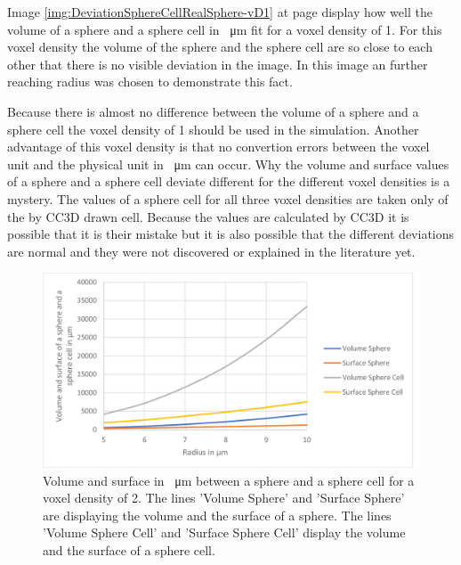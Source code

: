 Image \ref{img:DeviationSphereCellRealSphere-vD1} at page \pageref{img:DeviationSphereCellRealSphere-vD1} display how well the volume of a sphere and a sphere cell in \SI{}{\micro\metre} fit for a voxel density of 1. For this voxel density the volume of the sphere and the sphere cell are so close to each other that there is no visible deviation in the image. In this image an further reaching radius was chosen to demonstrate this fact.

Because there is almost no difference between the volume of a sphere and a sphere cell the voxel density of 1 should be used in the simulation. Another advantage of this voxel density is that no convertion errors between the voxel unit and the physical unit in \SI{}{\micro\metre} can occur. \newline
Why the volume and surface values of a sphere and a sphere cell deviate different for the different voxel densities is a mystery. The values of a sphere cell for all three voxel densities are taken only of the by \ac{CC3D} drawn cell. Because the values are calculated by \ac{CC3D} it is possible that it is their mistake but it is also possible that the different deviations are normal and they were not discovered or explained in the literature yet.
\begin{figure}[ht]
	\center
	\includegraphics[scale=0.3]{figures/DeviationSphereToPixelSphere-vD2.png}
	\caption[Volume and surface in \SI{}{\micro\metre} between a sphere and a sphere cell for a voxel density of 2]{Volume and surface in \SI{}{\micro\metre} between a sphere and a sphere cell for a voxel density of 2. The lines 'Volume Sphere' and 'Surface Sphere' are displaying the volume and the surface of a sphere. The lines 'Volume Sphere Cell' and 'Surface Sphere Cell' display the volume and the surface of a sphere cell.}
	\label{img:DeviationSphereCellRealSphere-vD2}
\end{figure}


